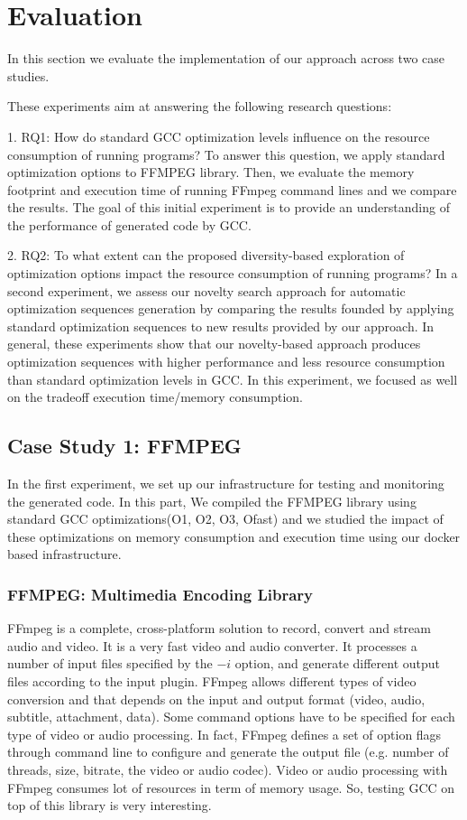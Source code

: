 \section{Evaluation}
In this section we evaluate the implementation of our
approach across two case studies. 

These experiments aim at answering the following research questions:

1. RQ1: How do standard GCC optimization levels influence
on the resource consumption of running programs?
To answer this question, we apply standard optimization options to FFMPEG library. Then, we evaluate the memory footprint and execution time of running FFmpeg command lines and we
compare the results. The goal of this initial experiment is to
provide an understanding of the performance of
generated code by GCC.

2. RQ2: To what extent can the proposed diversity-based
exploration of optimization options impact the resource
consumption of running programs?
In a second experiment, we assess our novelty search
approach for automatic optimization sequences generation by
comparing the results founded by applying standard optimization sequences to new
results provided by our approach. In general, these experiments
show that our novelty-based approach produces optimization
sequences with higher performance and less resource consumption
than standard optimization levels in GCC. In this experiment, we focused as well on the tradeoff execution time/memory consumption.




\subsection{Case Study 1: FFMPEG}
In the first experiment, we set up our infrastructure for testing and monitoring the generated code. In this part, We compiled the FFMPEG library using standard GCC optimizations(O1, O2, O3, Ofast) and we studied the impact of these optimizations on memory consumption and execution time using our docker based infrastructure.

\subsubsection{FFMPEG: Multimedia Encoding Library}
FFmpeg is a complete, cross-platform solution to record, convert and stream audio and video. It is a very fast video and audio converter. It processes a number of input files specified by the $-i$ option, and generate different output files according to the input plugin. FFmpeg allows different types of video conversion and that depends on the input and output format (video, audio, subtitle, attachment, data).
Some command options have to be specified for each type of video or audio processing. In fact,
FFmpeg defines a set of option flags through command line to configure and generate the output
file (e.g. number of threads, size, bitrate, the video or audio codec). Video or audio processing with FFmpeg consumes lot of resources in term of memory usage. So, testing GCC on top of this library is very interesting. 
